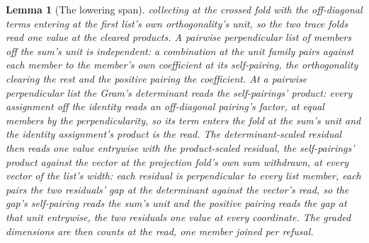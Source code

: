 \documentclass[11pt]{article}
\newtheorem{lemma}{Lemma}
\theoremstyle{definition}
\begin{document}
\begin{lemma}[The lowering span]
collecting at the crossed fold with the off-diagonal terms
entering at the first list's own orthogonality's unit, so the two
trace folds read one value at the cleared products. A pairwise
perpendicular list of members off the sum's unit is independent:
a combination at the unit family pairs against each member to the
member's own coefficient at its self-pairing, the orthogonality
clearing the rest and the positive pairing the coefficient. At a
pairwise perpendicular list the Gram's determinant reads the
self-pairings' product: every assignment off the identity reads an
off-diagonal pairing's factor, at equal members by the
perpendicularity, so its term enters the fold at the sum's unit
and the identity assignment's product is the read. The
determinant-scaled residual then reads one value entrywise with
the \emph{product-scaled residual}, the self-pairings' product
against the vector at the projection fold's own sum withdrawn, at
every vector of the list's width: each residual is perpendicular
to every list member, each pairs the two residuals' gap at the
determinant against the vector's read, so the gap's self-pairing
reads the sum's unit and the positive pairing reads the gap at
that unit entrywise, the two residuals one value at every
coordinate.
The graded dimensions are then counts at
the read, one member joined per refusal.
\end{lemma}
\end{document}
